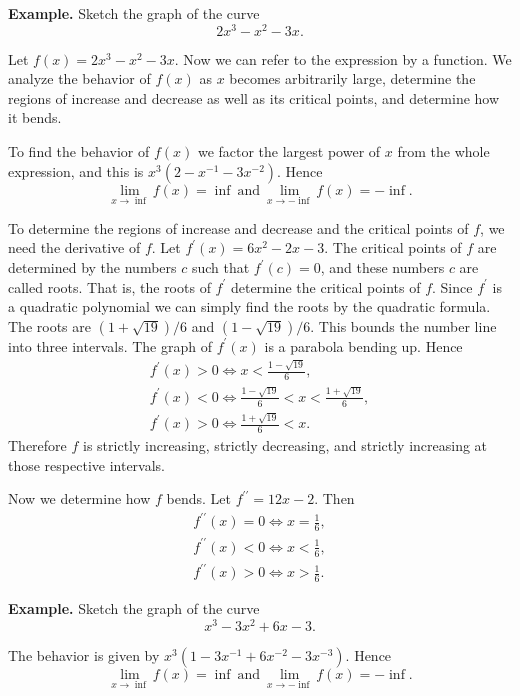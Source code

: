 
\textbf{Example.} Sketch the graph of the curve
\[2x^3 - x^2 - 3x.\]

Let $f(x) = 2x^3 - x^2 -3x$. Now we can refer to the expression by a function. We analyze the behavior of $f(x)$ as $x$ becomes arbitrarily large, determine the regions of increase and decrease as well as its critical points, and determine how it bends.

To find the behavior of $f(x)$ we factor the largest power of $x$ from the whole expression, and this is $x^3(2 - x^{-1} - 3x^{-2})$. Hence
\[\lim_{x\to\inf} f(x) = \inf\: \text{and}\: \lim_{x\to-\inf} f(x) = -\inf.\]

To determine the regions of increase and decrease and the critical points of $f$, we need the derivative of $f$. Let $f^\prime(x) = 6x^2 -2x - 3$. The critical points of $f$ are determined by the numbers $c$ such that $f^\prime(c) = 0$, and these numbers $c$ are called roots. That is, the roots of $f^\prime$ determine the critical points of $f$. Since $f^\prime$ is a quadratic polynomial we can simply find the roots by the quadratic formula. The roots are $(1 + \sqrt{19})/6$ and $(1 - \sqrt{19})/6$. This bounds the number line into three intervals. The graph of $f^\prime(x)$ is a parabola bending up. Hence
\begin{align}
f^\prime(x) > 0 \Leftrightarrow x < \frac{1 - \sqrt{19}}{6},\\
f^\prime(x) < 0 \Leftrightarrow \frac{1 - \sqrt{19}}{6} < x < \frac{1 + \sqrt{19}}{6},\\
f^\prime(x) > 0 \Leftrightarrow \frac{1 + \sqrt{19}}{6} < x.
\end{align}
Therefore $f$ is strictly increasing, strictly decreasing, and strictly increasing at those respective intervals.

Now we determine how $f$ bends. Let $f^{\prime\prime} = 12x - 2$. Then
\begin{align}
f^{\prime\prime}(x) = 0 \Leftrightarrow x = \frac{1}{6},\\
f^{\prime\prime}(x) < 0 \Leftrightarrow x < \frac{1}{6},\\
f^{\prime\prime}(x) > 0 \Leftrightarrow x > \frac{1}{6}.
\end{align}

\textbf{Example.} Sketch the graph of the curve
\[x^3 - 3x^2 + 6x - 3.\]

The behavior is given by $x^3(1 - 3x^{-1} + 6x^{-2} - 3x^{-3})$. Hence
\[\lim_{x\to\inf} f(x) = \inf\: \text{and}\: \lim_{x\to-\inf} f(x) = -\inf.\]

